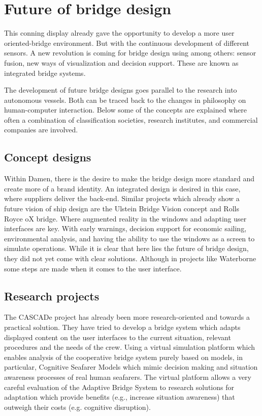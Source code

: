 \section{Future of bridge design}
This conning display already gave the opportunity to develop a more user oriented-bridge environment. But with the continuous development of different sensors. A new revolution is coming for bridge design using among others: sensor fusion, new ways of visualization and decision support. These are known as integrated bridge systems.

The development of future bridge designs goes parallel to the research into autonomous vessels. Both can be traced back to the changes in philosophy on human-computer interaction. Below some of the concepts are explained where often a combination of classification societies, research institutes, and commercial companies are involved.

\subsection{Concept designs}
Within Damen, there is the desire to make the bridge design more standard and create more of a brand identity. An integrated design is desired in this case, where suppliers deliver the back-end. Similar projects which already show a future vision of ship design are the Ulstein Bridge Vision concept and Rolls Royce oX bridge. Where augmented reality in the windows and adapting user interfaces are key. With early warnings, decision support for economic sailing, environmental analysis, and having the ability to use the windows as a screen to simulate operations. While it is clear that here lies the future of bridge design, they did not yet come with clear solutions. Although in projects like Waterborne some steps are made when it comes to the user interface.\cite{RollsRoyce2015} \cite{Ulstein2013}

\subsection{Research projects}
The CASCADe project has already been more research-oriented and towards a practical solution. They have tried to develop a bridge system which adapts displayed content on the user interfaces to the current situation, relevant procedures and the needs of the crew. Using a virtual simulation platform which enables analysis of the cooperative bridge system purely based on models, in particular, Cognitive Seafarer Models which mimic decision making and situation awareness processes of real human seafarers. The virtual platform allows a very careful evaluation of the Adaptive Bridge System to research solutions for adaptation which provide benefits (e.g., increase situation awareness) that outweigh their costs (e.g. cognitive disruption).\cite{CASCADe2015}

